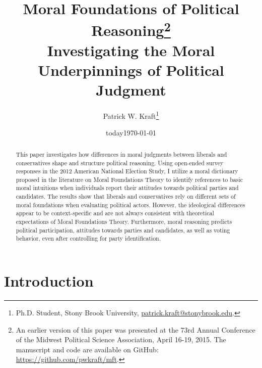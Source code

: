 \documentclass[12pt]{article}
\author{Patrick W. Kraft\footnote{Ph.D. Student, Stony Brook University, \href{mailto:patrick.kraft@stonybrook.edu}{patrick.kraft@stonybrook.edu}.
}}
\date{today}
\title{Moral Foundations of Political Reasoning\footnote{An earlier version of this paper was presented at the 73rd Annual Conference of the Midwest Political Science Association, April 16-19, 2015. The manuscript and code are available on GitHub: \url{https://github.com/pwkraft/mft}.}\\
\large{Investigating the Moral Underpinnings of Political Judgment}}
\date{\today}
\begin{document}
\maketitle
\onehalfspacing

\begin{abstract}
This paper investigates how differences in moral judgments between liberals and conservatives shape and structure political reasoning. Using open-ended survey responses in the 2012 American National Election Study, I utilize a moral dictionary proposed in the literature on Moral Foundations Theory to identify references to basic moral intuitions when individuals report their attitudes towards political parties and candidates. The results show that liberals and conservatives rely on different sets of moral foundations when evaluating political actors. However, the ideological differences appear to be context-specific and are not always consistent with theoretical expectations of Moral Foundations Theory. Furthermore, moral reasoning predicts political participation, attitudes towards parties and candidates, as well as voting behavior, even after controlling for party identification.

\end{abstract}
\newpage


\section{Introduction}
\end{document}
